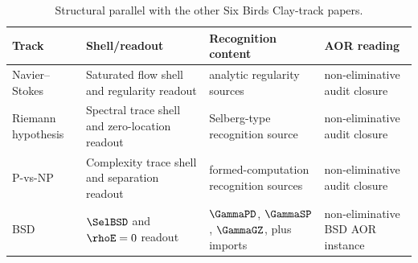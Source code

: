 \begin{table}[tbp]
\centering
\small
\caption{Structural parallel with the other Six Birds Clay-track papers.}
\label{tab:clay-track-parallel}
\begin{tabularx}{\textwidth}{@{}>{\raggedright\arraybackslash}p{}
>{\raggedright\arraybackslash}p{}
>{\raggedright\arraybackslash}p{}
>{\raggedright\arraybackslash}X@{}}
\toprule
Track & Shell/readout & Recognition content & AOR reading \\
\midrule
Navier--Stokes & Saturated flow shell and regularity readout & analytic
regularity sources & non-eliminative audit closure \\
Riemann hypothesis & Spectral trace shell and zero-location readout &
Selberg-type recognition source & non-eliminative audit closure \\
P-vs-NP & Complexity trace shell and separation readout & formed-computation
recognition sources & non-eliminative audit closure \\
BSD & \(\SelBSD\) and \(\rhoE=0\) readout & \(\GammaPD\), \(\GammaSP\),
\(\GammaGZ\), plus imports & non-eliminative BSD AOR instance \\
\bottomrule
\end{tabularx}
\end{table}
